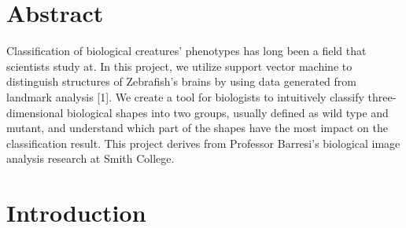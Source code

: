 \documentclass[10pt,letterpaper]{article}
\date{}
\newcommand{\getIndex}[2]{
  \ForEach{,}{\IfEq{#1}{\thislevelitem}{\number\thislevelcount\ExitForEach}{}}{#2}
}
\newcommand{\getAff}[1]{
  \getIndex{#1}{Smith College}
}
\begin{document}
\vspace*{0.2in}

\section*{Abstract}
Classification of biological creatures' phenotypes has long been a field
that scientists study at. In this project, we utilize support vector
machine to distinguish structures of Zebrafish's brains by using data
generated from landmark analysis {[}1{]}. We create a tool for
biologists to intuitively classify three-dimensional biological shapes
into two groups, usually defined as wild type and mutant, and understand
which part of the shapes have the most impact on the classification
result. This project derives from Professor Barresi's biological image
analysis research at Smith College.


\linenumbers

\newpage

\section{Introduction}\label{introduction}
\end{document}
